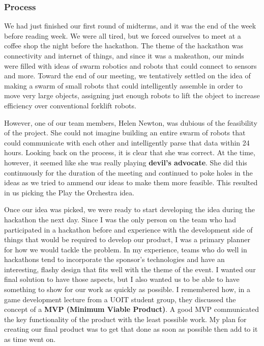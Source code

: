 \documentclass[a4paper,12pt]{article}
\begin{document}
\subsubsection{Process}
We had just finished our first round of midterms, and it was the end of the week before reading week. We were all tired, but we forced ourselves to meet at a coffee shop the night before the hackathon. The theme of the hackathon was connectivity and internet of things, and since it was a makeathon, our minds were filled with ideas of swarm robotics and robots that could connect to sensors and more. Toward the end of our meeting, we tentatively settled on the idea of making a swarm of small robots that could intelligently assemble in order to move very large objects, assigning just enough robots to lift the object to increase efficiency over conventional forklift robots.

However, one of our team members, Helen Newton, was dubious of the feasibility of the project. She could not imagine building an entire swarm of robots that could communicate with each other and intelligently parse that data within 24 hours. Looking back on the process, it is clear that she was correct. At the time, however, it seemed like she was really playing \textbf{devil’s advocate}. She did this continuously for the duration of the meeting and continued to poke holes in the ideas as we tried to ammend our ideas to make them more feasible. This resulted in us picking the Play the Orchestra idea.

Once our idea was picked, we were ready to start developing the idea during the hackathon the next day. Since I was the only person on the team who had participated in a hackathon before and experience with the development side of things that would be required to develop our product, I was a primary planner for how we would tackle the problem. In my experience, teams who do well in hackathons tend to incorporate the sponsor’s technologies and have an interesting, flashy design that fits well with the theme of the event. I wanted our final solution to have those aspects, but I also wanted us to be able to have something to show for our work as quickly as possible. I remembered how, in a game development lecture from a UOIT student group, they discussed the concept of a \textbf{MVP (Minimum Viable Product)}. A good MVP communicated the key functionality of the product with the least possible work. My plan for creating our final product was to get that done as soon as possible then add to it as time went on.
\end{document}
